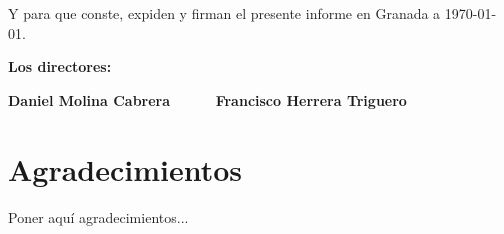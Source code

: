 \vspace{0.5cm}

Y para que conste, expiden y firman el presente informe en Granada a \today.

\vspace{1cm}

\textbf{Los directores:}

\vspace{5cm}

\noindent \textbf{Daniel Molina Cabrera \ \ \ \ \ Francisco Herrera Triguero}

\chapter*{Agradecimientos}
\thispagestyle{empty}

       \vspace{1cm}


Poner aquí agradecimientos...

